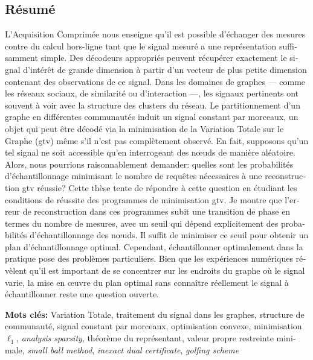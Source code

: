 \begin{otherlanguage}{french}
\chapter*{Résumé}

\vspace*{\fill}

L'Acquisition Comprimée nous enseigne qu'il est possible d'échanger des mesures contre du calcul hors-ligne tant que le signal mesuré a une représentation suffisamment simple. Des décodeurs appropriés peuvent récupérer exactement le signal d’intérêt de grande dimension à partir d’un vecteur de plus petite dimension contenant des observations de ce signal. Dans les domaines de graphes --- comme les réseaux sociaux, de similarité ou d'interaction ---, les signaux pertinents ont souvent à voir avec la structure des clusters du réseau. Le partitionnement d'un graphe en différentes communautés induit un signal constant par morceaux, un objet qui peut être décodé via la minimisation de la Variation Totale sur le Graphe (\acrshort{gtv}) même s'il n'est pas complètement observé. En fait, supposons qu'un tel signal ne soit accessible qu'en interrogeant des nœuds de manière aléatoire. Alors, nous pourrions raisonnablement demander: quelles sont les probabilités d’échantillonnage minimisant le nombre de requêtes nécessaires à une reconstruction \acrshort{gtv} réussie? Cette thèse tente de répondre à cette question en étudiant les conditions de réussite des programmes de minimisation \acrshort{gtv}. Je montre que l’erreur de reconstruction dans ces programmes subit une transition de phase en termes du nombre de mesures, avec un seuil qui dépend explicitement des probabilités d’échantillonnage des nœuds. Il suffit de minimiser ce seuil pour obtenir un plan d'échantillonnage optimal. Cependant, échantillonner optimalement dans la pratique pose des problèmes particuliers. Bien que les expériences numériques révèlent qu'il est important de se concentrer sur les endroits du graphe où le signal varie, la mise en œuvre du plan optimal sans connaître réellement le signal à échantillonner reste une question ouverte.

\vspace*{\fill}

\textbf{Mots clés:} Variation Totale, traitement du signal dans les graphes, structure de communauté, signal constant par morceaux, optimisation convexe, minimisation  $\ell_1$, \emph{analysis sparsity}, théorème du représentant, valeur propre restreinte minimale, \emph{small ball method}, \emph{inexact dual certificate}, \emph{golfing scheme}

\vfill

\end{otherlanguage}

